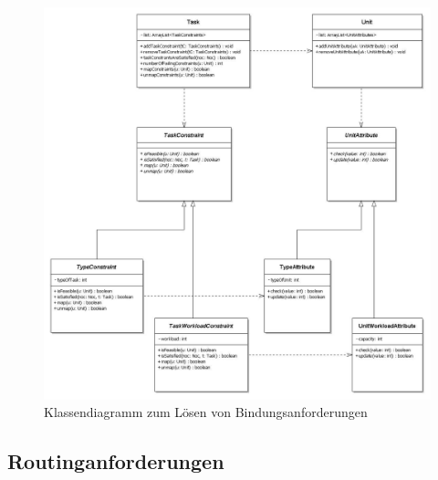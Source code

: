 \begin{figure}[H]\centering
  \includegraphics[width = 150mm]{bilder/task-unit.jpg}
  \caption{Klassendiagramm zum Lösen von Bindungsanforderungen}\label{fig:klBind}
\end{figure}

\subsection{Routinganforderungen}

